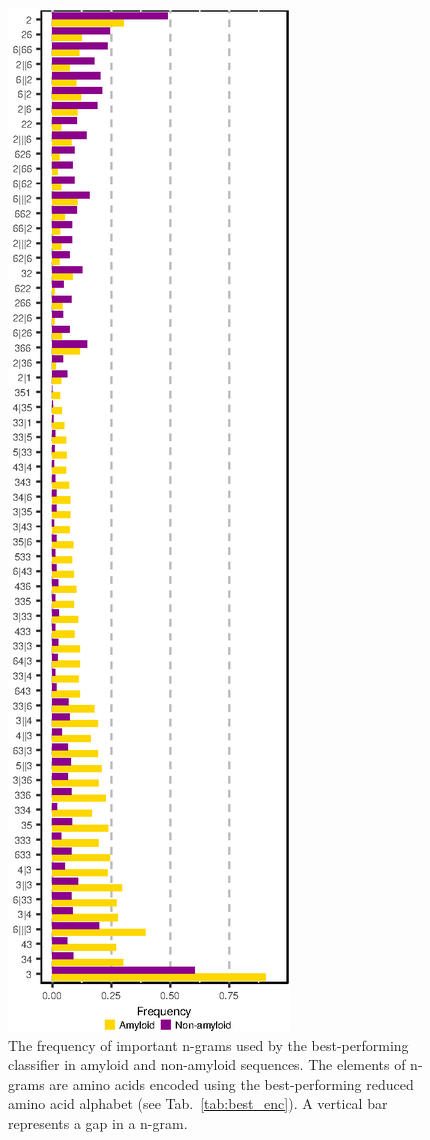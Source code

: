 \documentclass[a4,center,fleqn]{NAR}
\begin{document}
\begin{figure}[!tpb]
\centerline{\includegraphics{figures/ngrams.eps}}
\caption{The frequency of important n-grams used by the best-performing classifier 
in amyloid and non-amyloid sequences. The elements of n-grams 
are amino acids encoded using the best-performing reduced amino acid 
alphabet (see Tab.~\ref{tab:best_enc}). A vertical bar 
represents a gap in a n-gram.}\label{fig:ngrams}
\end{figure}
\end{document}
